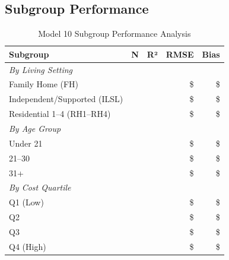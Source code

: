 \subsection{Subgroup Performance}

\begin{table}[h]
\centering
\caption{Model 10 Subgroup Performance Analysis}
\begin{tabular}{lrrrr}
\toprule
\textbf{Subgroup} & \textbf{N} & \textbf{R²} & \textbf{RMSE} & \textbf{Bias} \\
\midrule
\multicolumn{5}{l}{\textit{By Living Setting}} \\
Family Home (FH) & \ModelTenSubgrouplivingFHN{} & \ModelTenSubgrouplivingFHRSquared{} & \$\ModelTenSubgrouplivingFHRMSE{} & \$\ModelTenSubgrouplivingFHBias{} \\
Independent/Supported (ILSL) & \ModelTenSubgrouplivingILSLN{} & \ModelTenSubgrouplivingILSLRSquared{} & \$\ModelTenSubgrouplivingILSLRMSE{} & \$\ModelTenSubgrouplivingILSLBias{} \\
Residential 1--4 (RH1--RH4) & \ModelTenSubgrouplivingRHOneToFourN{} & \ModelTenSubgrouplivingRHOneToFourRSquared{} & \$\ModelTenSubgrouplivingRHOneToFourRMSE{} & \$\ModelTenSubgrouplivingRHOneToFourBias{} \\
\midrule
\multicolumn{5}{l}{\textit{By Age Group}} \\
Under 21 & \ModelTenSubgroupageAgeUnderTwentyOneN{} & \ModelTenSubgroupageAgeUnderTwentyOneRSquared{} & \$\ModelTenSubgroupageAgeUnderTwentyOneRMSE{} & \$\ModelTenSubgroupageAgeUnderTwentyOneBias{} \\
21--30 & \ModelTenSubgroupageAgeTwentyOneToThirtyN{} & \ModelTenSubgroupageAgeTwentyOneToThirtyRSquared{} & \$\ModelTenSubgroupageAgeTwentyOneToThirtyRMSE{} & \$\ModelTenSubgroupageAgeTwentyOneToThirtyBias{} \\
31+ & \ModelTenSubgroupageAgeThirtyOnePlusN{} & \ModelTenSubgroupageAgeThirtyOnePlusRSquared{} & \$\ModelTenSubgroupageAgeThirtyOnePlusRMSE{} & \$\ModelTenSubgroupageAgeThirtyOnePlusBias{} \\
\midrule
\multicolumn{5}{l}{\textit{By Cost Quartile}} \\
Q1 (Low) & \ModelTenSubgroupcostQOneLowN{} & \ModelTenSubgroupcostQOneLowRSquared{} & \$\ModelTenSubgroupcostQOneLowRMSE{} & \$\ModelTenSubgroupcostQOneLowBias{} \\
Q2 & \ModelTenSubgroupcostQTwoN{} & \ModelTenSubgroupcostQTwoRSquared{} & \$\ModelTenSubgroupcostQTwoRMSE{} & \$\ModelTenSubgroupcostQTwoBias{} \\
Q3 & \ModelTenSubgroupcostQThreeN{} & \ModelTenSubgroupcostQThreeRSquared{} & \$\ModelTenSubgroupcostQThreeRMSE{} & \$\ModelTenSubgroupcostQThreeBias{} \\
Q4 (High) & \ModelTenSubgroupcostQFourHighN{} & \ModelTenSubgroupcostQFourHighRSquared{} & \$\ModelTenSubgroupcostQFourHighRMSE{} & \$\ModelTenSubgroupcostQFourHighBias{} \\
\bottomrule
\end{tabular}
\end{table}


